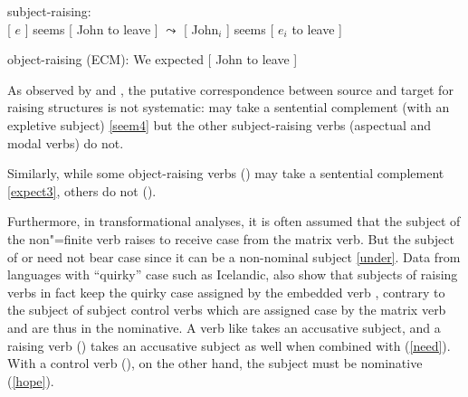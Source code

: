 \documentclass[output=paper
                ,modfonts
                ,nonflat
	        ,collection
	        ,collectionchapter
	        ,collectiontoclongg
 	        ,biblatex
                ,babelshorthands
                ,newtxmath
                ,draftmode
                ,colorlinks, citecolor=brown
]{./langsci/langscibook}
\begin{document}
\begin{exe}
\ex  \begin{xlist}
\ex 	subject-raising:\\
{}[ $e$ ] seems [ John to leave ] 
$\leadsto$  
{}[ John$_{i}$ ] seems [ $e_{i}$ to leave ]	

\ex 	object-raising (ECM): We expected [ John to leave ] 	
 \end{xlist}
 \end{exe}

 As observed by \citet{Bresnan1982} and \citet{SagandPollard1991}, the putative correspondence between source and target for raising structures is not systematic:  may take a sentential complement (with an expletive subject) \ref{seem4} but the other subject-raising verbs (aspectual and modal verbs) do not. 


\eal
{}
\zl
 
Similarly, while some object-raising verbs () may take a sentential complement \ref{expect3}, others do not ().
 
\eal
{}
\zl
\eal
{}
\zl

Furthermore, in transformational analyses, it is often assumed that the subject of the non"=finite verb  raises to receive case from the matrix verb.
 But the subject of  or  need not bear case  since it can be a non-nominal subject \ref{under}.
Data from languages with ``quirky'' case such as Icelandic, also show that subjects of raising verbs in fact keep the quirky case assigned by the embedded verb  \citep{Zaenenetal1985}, contrary to the subject of subject control verbs which are assigned case by the matrix verb and are thus in the nominative. A verb like  takes an accusative subject, and a raising verb () takes an accusative subject as well when combined with  (\ref{need}). With a control verb (), on the other hand, the subject must be nominative (\ref{hope}).
\end{document}
